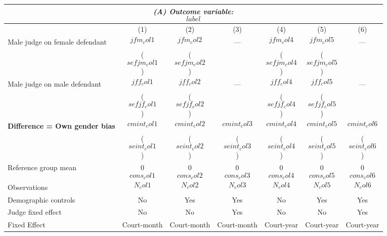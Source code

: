 {
\def\sym#1{\ifmmode^{#1}\else\(^{#1}\)\fi}
\begin{tabular}{l*{6}{c}}
  \hline\hline
\multicolumn{7}{c}{\textit{(A) Outcome variable: $$label$$}}\\
\hline
&\multicolumn{1}{c}{(1)}&\multicolumn{1}{c}{(2)}&\multicolumn{1}{c}{(3)}&\multicolumn{1}{c}{(4)}&\multicolumn{1}{c}{(5)}&\multicolumn{1}{c}{(6)}\\
\hline
Male judge on female defendant \hspace{15mm} & $$jfm_col1$$ & $$jfm_col2$$ & --- & $$jfm_col4$$ & $$jfm_col5$$ & --- \\
& ($$sefjm_col1$$) & ($$sefjm_col2$$) &  & ($$sefjm_col4$$) &($$sefjm_col5$$) &  \\
Male judge on male defendant \hspace{15mm} & $$jff_col1$$ & $$jff_col2$$ & ---& $$jff_col4$$ & $$jff_col5$$ & --- \\
& ($$sefjf_col1$$) & ($$sefjf_col2$$) &  & ($$sefjf_col4$$) & ($$sefjf_col5$$) &  \\
\textbf{Difference = Own gender bias} \hspace{15mm} & $$cmint_col1$$ & $$cmint_col2$$ & $$cmint_col3$$ & $$cmint_col4$$ & $$cmint_col5$$ & $$cmint_col6$$ \\
& ($$seint_col1$$) & ($$seint_col2$$) & ($$seint_col3$$) & ($$seint_col4$$) & ($$seint_col5$$) & ($$seint_col6$$) \\
\hline
Reference group mean & 0$$cons_col1$$ & 0$$cons_col2$$ & 0$$cons_col3$$ & 0$$cons_col4$$ & 0$$cons_col5$$ & 0$$cons_col6$$ \\
Observations & $$N_col1$$ & $$N_col2$$ & $$N_col3$$ & $$N_col4$$ & $$N_col5$$ & $$N_col6$$ \\
Demographic controls & No & Yes & Yes & No & Yes & Yes \\
Judge fixed effect & No & No & Yes & No & No & Yes \\
Fixed Effect & Court-month & Court-month & Court-month & Court-year & Court-year & Court-year \\
\hline\hline
\end{tabular}
}
 
